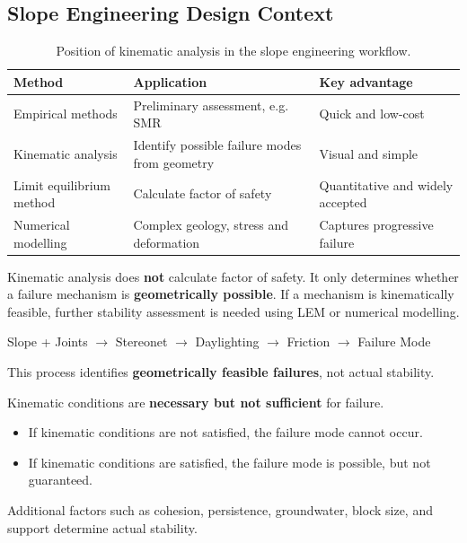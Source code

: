 \documentclass[a4paper,12pt]{article}
\begin{document}
\subsection{Slope Engineering Design Context}

\begin{table}[h!]
\centering
\begin{tabularx}{\textwidth}{l X X}
\toprule
\textbf{Method} & \textbf{Application} & \textbf{Key advantage} \\
\midrule
Empirical methods & Preliminary assessment, e.g. SMR & Quick and low-cost \\
Kinematic analysis & Identify possible failure modes from geometry & Visual and simple \\
Limit equilibrium method & Calculate factor of safety & Quantitative and widely accepted \\
Numerical modelling & Complex geology, stress and deformation & Captures progressive failure \\
\bottomrule
\end{tabularx}
\caption{Position of kinematic analysis in the slope engineering workflow.}
\end{table}

\begin{notebox}
Kinematic analysis does \textbf{not} calculate factor of safety. It only determines whether a failure mechanism is \textbf{geometrically possible}. If a mechanism is kinematically feasible, further stability assessment is needed using LEM or numerical modelling.
\end{notebox}

\begin{notebox}
\begin{center}
Slope + Joints $\rightarrow$ Stereonet $\rightarrow$ Daylighting $\rightarrow$ Friction $\rightarrow$ Failure Mode
\end{center}
\vspace{1.0 em}
This process identifies \textbf{geometrically feasible failures}, not actual stability.
\end{notebox}

\begin{warnbox}
Kinematic conditions are \textbf{necessary but not sufficient} for failure.
\vspace{1.0 em}
\begin{itemize}[nosep]
    \item If kinematic conditions are not satisfied, the failure mode cannot occur.
    \item If kinematic conditions are satisfied, the failure mode is possible, but not guaranteed.
\end{itemize}
\vspace{1.0 em}
Additional factors such as cohesion, persistence, groundwater, block size, and support determine actual stability.
\end{warnbox}
\end{document}
